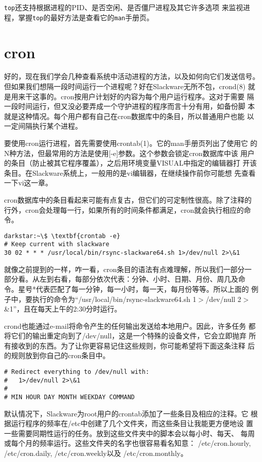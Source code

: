 \texttt{top}还支持根据进程的PID、是否空闲、是否僵尸进程及其它许多选项
来监视进程，掌握\texttt{top}的最好方法是查看它的\texttt{man}手册页。

\section{cron}
\label{sec:processControl:cron}

好的，现在我们学会几种查看系统中活动进程的方法，以及如何向它们发送信号。
但如果我们想隔一段时间运行一个进程呢？好在Slackware无所不包，crond(8)
就是用来干这事的。cron按用户计划好的内容为每个用户运行程序。这对于需要
隔一段时间运行，但又没必要弄成一个守护进程的程序而言十分有用，如备份脚
本就是这种情况。每个用户都有自己在cron数据库中的条目，所以普通用户也能
以一定间隔执行某个进程。

要使用cron运行进程，首先需要使用crontab(1)。它的man手册页列出了使用它
的N种方法，但最常用的方法是使用[-e]参数。这个参数会锁定cron数据库中该
用户的条目（防止被其它程序覆盖），之后用环境变量VISUAL中指定的编辑器打
开该条目。在Slackware系统上，一般用的是vi编辑器，在继续操作前你可能想
先查看一下vi这一章。

cron数据库中的条目看起来可能有点复古，但它们的可定制性很高。除了注释的
行外，cron会处理每一行，如果所有的时间条件都满足，cron就会执行相应的命
令。

\begin{Verbatim}[frame=single, commandchars=\\\{\}]
darkstar:~\$ \textbf{crontab -e}
# Keep current with slackware
30 02 * * * /usr/local/bin/rsync-slackware64.sh 1>/dev/null 2>\&1
\end{Verbatim}

就像之前提到的一样，咋一看，cron条目的语法有点难理解，所以我们一部分一
部分看。从左到右看，每部分依次代表：分钟、小时、日期、月份、周几及命
令。星号*代表匹配了每一分钟，每一小时，每一天，每月份等等。所以上面的
例子中，要执行的命令为``/usr/local/bin/rsync-slackware64.sh
1$>$/dev/null 2$>$\&1''，且在每天上午的2:30分时运行。

crond也能通过e-mail将命令产生的任何输出发送给本地用户。因此，许多任务
都将它们的输出重定向到了/dev/null，这是一个特殊的设备文件，它会立即抛弃
所有接收到的东西。为了让你更容易记住这些规则，你可能希望将下面这条注释
后的规则放到你自己的cron条目中。
\begin{Verbatim}[frame=single, commandchars=\\\{\}]
# Redirect everything to /dev/null with:
#   1>/dev/null 2>\&1
#
# MIN HOUR DAY MONTH WEEKDAY COMMAND
\end{Verbatim}

默认情况下，Slackware为root用户的crontab添加了一些条目及相应的注释。它
根据运行程序的频率在/etc中创建了几个文件夹，而这些条目让我能更方便地设
置一些需要同期性运行的任务。放到这些文件夹中的脚本会以每小时、每天、
每周或每个月的频率运行。这些文件夹的名字也很容易看名知意：
/etc/cron.hourly, /etc/cron.daily, /etc/cron.weekly以及
/etc/cron.monthly。




